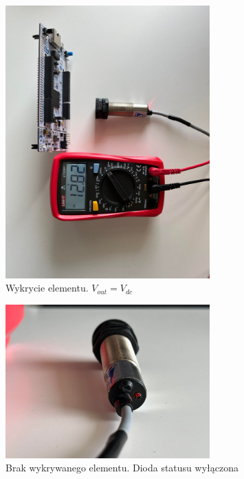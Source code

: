 \documentclass[11pt, a4paper]{article}
\begin{document}
\begin{figure}[h!]
    \centering
    \includegraphics[angle=-90, width=0.7\textwidth]{fig/SCOO/stnd1-on.jpg}
        \caption{Wykrycie elementu. $V_{out} = V_{dc}$}
\end{figure}

\newpage

\begin{figure}[h!]
    \centering
    \includegraphics[angle=0, width=0.7\textwidth]{fig/SCOO/stnd2-off.jpg}
    \caption{Brak wykrywanego elementu. Dioda statusu wyłączona}
\end{figure}
\end{document}
